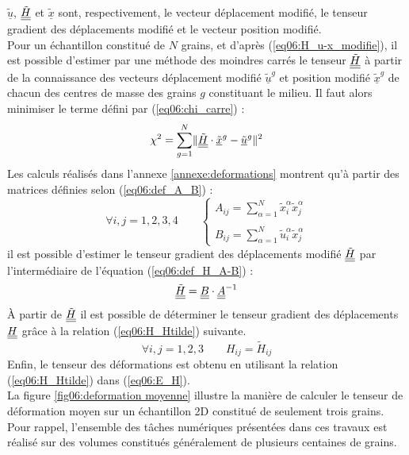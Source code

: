 		$\underline{\tilde{u}}$, $\underline{\underline{\tilde{H}}}$ et $\underline{\tilde{x}}$ sont, respectivement, le vecteur déplacement modifié, le tenseur gradient des déplacements modifié et le vecteur position modifié.
		\\Pour un échantillon constitué de $N$ grains, et d'après (\ref{eq06:H_u-x_modifie}), il est possible d'estimer par une méthode des moindres carrés le tenseur $\underline{\underline{\tilde{H}}}$ à partir de la connaissance des vecteurs déplacement modifié $\underline{\tilde{u}}^g$ et position modifié $\underline{\tilde{x}}^g$ de chacun des centres de masse des grains $g$ constituant le milieu. Il faut alors minimiser le terme défini par (\ref{eq06:chi_carre}) :
		\begin{equation}\label{eq06:chi_carre}
		\chi^2
		= \sum_{g=1}^{N} \lVert \underline{\underline{\tilde{H}}} \cdot \underline{\tilde{x}}^g - \underline{\tilde{u}}^g \rVert^2
		\end{equation}
		Les calculs réalisés dans l'annexe \ref{annexe:deformations} montrent qu'à partir des matrices définies selon (\ref{eq06:def_A_B}) :
		\begin{equation}\label{eq06:def_A_B}
			\forall i,j = 1,2,3,4\quad\quad\left\{
			\begin{array}{l}
				A_{ij} = \sum\limits_{\alpha=1}^N \tilde{x}_i^\alpha \tilde{x}_j^\alpha\\\\
				B_{ij} = \sum\limits_{\alpha=1}^{N} \tilde{u}_i^\alpha \tilde{x}_j^\alpha
			\end{array}\right.
		\end{equation}
		il est possible d'estimer le tenseur gradient des déplacements modifié $\underline{\underline{\tilde{H}}}$ par l'intermédiaire de l'équation (\ref{eq06:def_H_A-B}) :
		\begin{equation}\label{eq06:def_H_A-B}
			\underline{\underline{\tilde{H}}} = \underline{\underline{B}} \cdot \underline{\underline{A}}^{-1}
		\end{equation}
		\`A partir de $\underline{\underline{\tilde{H}}}$ il est possible de déterminer le tenseur gradient des déplacements $\underline{\underline{H}}$ grâce à la relation (\ref{eq06:H_Htilde}) suivante.
		\begin{equation}\label{eq06:H_Htilde}
			\forall i,j = 1,2,3\qquad
			H_{ij} = \tilde{H}_{ij}
		\end{equation}
		Enfin, le tenseur des déformations est obtenu en utilisant la relation (\ref{eq06:H_Htilde}) dans (\ref{eq06:E_H}).
		\\La figure \ref{fig06:deformation moyenne} illustre la manière de calculer le tenseur de déformation moyen sur un échantillon 2D constitué de seulement trois grains. Pour rappel, l'ensemble des tâches numériques présentées dans ces travaux est réalisé sur des volumes constitués généralement de plusieurs centaines de grains.
